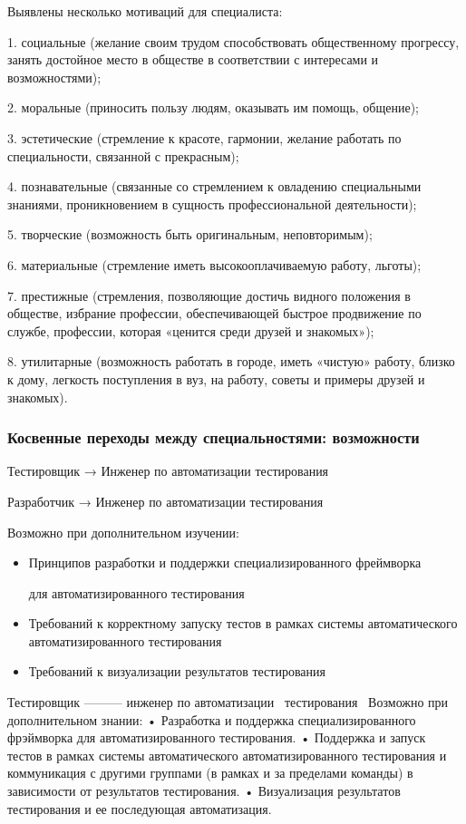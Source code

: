\documentclass{../industrial-development}
\begin{document}
\lecturenotes

Выявлены несколько мотиваций для специалиста:

1. социальные (желание своим трудом способствовать общественному прогрессу, занять достойное место в обществе в соответствии с интересами и возможностями);

2. моральные (приносить пользу людям, оказывать им помощь, общение);

3. эстетические (стремление к красоте, гармонии, желание работать по специальности, связанной с прекрасным);

4. познавательные (связанные со стремлением к овладению специальными знаниями, проникновением в сущность профессиональной деятельности);

5. творческие (возможность быть оригинальным, неповторимым);

6. материальные (стремление иметь высокооплачиваемую работу, льготы);

7. престижные (стремления, позволяющие достичь видного положения в обществе, избрание профессии, обеспечивающей быстрое продвижение по службе, профессии, которая «ценится среди друзей и знакомых»);

8. утилитарные (возможность работать в городе, иметь «чистую» работу, близко к дому, легкость поступления в вуз, на работу, советы и примеры друзей и знакомых).

 \begin{frame} \frametitle{Косвенные переходы между специальностями: возможности }

 \begin{block}{Тестировщик →  Инженер по автоматизации тестирования    

Разработчик →   Инженер по автоматизации тестирования }
Возможно при дополнительном изучении:
  \end{block}
\begin{itemize}
  \item Принципов разработки и поддержки специализированного фреймворка 

для автоматизированного тестирования
  \item Требований к корректному запуску тестов в рамках системы автоматического автоматизированного тестирования
\item Требований к визуализации результатов тестирования
  \end{itemize}
\end{frame}

\lecturenotes


Тестировщик --------- инженер по автоматизации~\cite{hh} тестирования~\cite{itcf}
Возможно при дополнительном знании:
•	Разработка и поддержка специализированного фрэймворка для автоматизированного тестирования.
•	Поддержка и запуск тестов в рамках системы автоматического автоматизированного тестирования и коммуникация с другими группами (в рамках и за пределами команды) в зависимости от результатов тестирования.
•	Визуализация результатов тестирования и ее последующая автоматизация.
\end{document}
